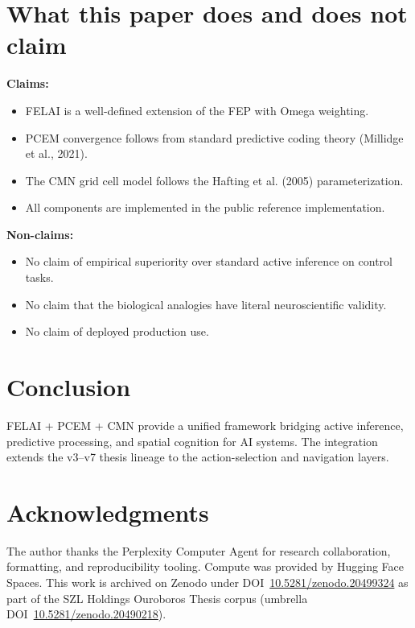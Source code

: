 \documentclass[11pt]{article}
\theoremstyle{plain}
\begin{document}
\section{What this paper does and does not claim}

\textbf{Claims:}
\begin{itemize}
  \item FELAI is a well-defined extension of the FEP with Omega weighting.
  \item PCEM convergence follows from standard predictive coding theory (Millidge et al., 2021).
  \item The CMN grid cell model follows the Hafting et al. (2005) parameterization.
  \item All components are implemented in the public reference implementation.
\end{itemize}

\textbf{Non-claims:}
\begin{itemize}
  \item No claim of empirical superiority over standard active inference on control tasks.
  \item No claim that the biological analogies have literal neuroscientific validity.
  \item No claim of deployed production use.
\end{itemize}


\section{Conclusion}

FELAI + PCEM + CMN provide a unified framework bridging active inference, predictive processing, and spatial cognition for AI systems. The integration extends the v3–v7 thesis lineage to the action-selection and navigation layers.




\section*{Acknowledgments}
The author thanks the Perplexity Computer Agent for research collaboration, formatting, and
reproducibility tooling. Compute was provided by Hugging Face Spaces. This work is archived on
Zenodo under DOI~\href{https://doi.org/10.5281/zenodo.20499324}{10.5281/zenodo.20499324} as part of the SZL Holdings Ouroboros Thesis
corpus (umbrella DOI~\href{https://doi.org/10.5281/zenodo.20490218}{10.5281/zenodo.20490218}).

\nocite{05ref1,05ref2,05ref3,05ref4,05ref5,05ref6,05ref7,05ref8}


\end{document}
